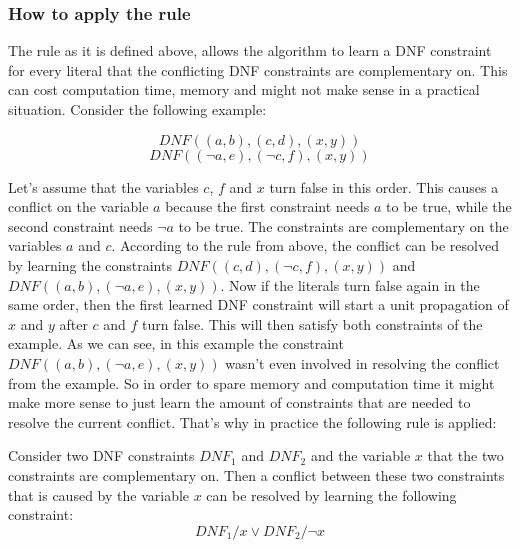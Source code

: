 \subsubsection{How to apply the rule}

The rule as it is defined above, allows the algorithm to learn a DNF constraint for every literal that the conflicting DNF constraints are complementary on. This can cost computation time, memory and might not make sense in a practical situation. Consider the following example:

\begin{leftbar}
\begin{displaymath}
DNF((a,b),(c,d),(x,y))
\end{displaymath}
\begin{displaymath}
DNF((\neg a, e),(\neg c, f), (x,y))
\end{displaymath}
\end{leftbar}

Let's assume that the variables $c$, $f$ and $x$ turn false in this order. This causes a conflict on the variable $a$ because the first constraint needs $a$ to be true, while the second constraint needs $\neg a$ to be true. The constraints are complementary on the variables $a$ and $c$. According to the rule from above, the conflict can be resolved by learning the constraints $DNF((c,d),(\neg c, f),(x,y))$ and $DNF((a,b),(\neg a, e),(x,y))$. Now if the literals turn false again in the same order, then the first learned DNF constraint will start a unit propagation of $x$ and $y$ after $c$ and $f$ turn false. This will then satisfy both constraints of the example. As we can see, in this example the constraint $DNF((a,b),(\neg a, e),(x,y))$ wasn't even involved in resolving the conflict from the example. So in order to spare memory and computation time it might make more sense to just learn the amount of constraints that are needed to resolve the current conflict. That's why in practice the following rule is applied:

\begin{leftbar}
Consider two DNF constraints $DNF_1$ and $DNF_2$ and the variable $x$ that the two constraints are complementary on. Then a conflict between these two constraints that is caused by the variable $x$ can be resolved by learning the following constraint:
\begin{displaymath}
DNF_1 / x \vee DNF_2 / \neg x
\end{displaymath}
\end{leftbar}

